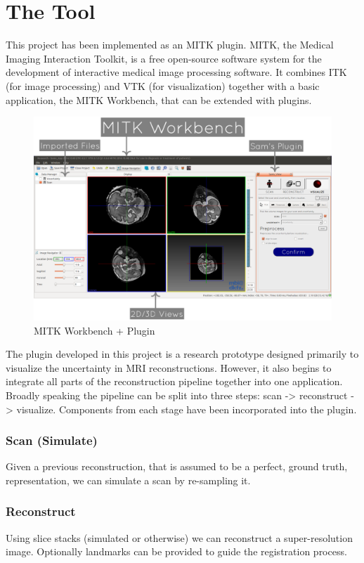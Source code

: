 \chapter{The Tool}
This project has been implemented as an MITK plugin. MITK, the Medical Imaging Interaction Toolkit, is a free open-source software system for the development of interactive medical image processing software. It combines ITK (for image processing) and VTK (for visualization) together with a basic application, the MITK Workbench, that can be extended with plugins.

\begin{figure}[H]
  \includegraphics[width=\textwidth]{images/tool/mitk.png}
  \caption{MITK Workbench + Plugin}\label{fig:mitkoverview}
\end{figure}

The plugin developed in this project is a research prototype designed primarily to visualize the uncertainty in MRI reconstructions. However, it also begins to integrate all parts of the reconstruction pipeline together into one application. Broadly speaking the pipeline can be split into three steps: scan -> reconstruct -> visualize. Components from each stage have been incorporated into the plugin.

\subsection*{Scan (Simulate)}
Given a previous reconstruction, that is assumed to be a perfect, ground truth, representation, we can simulate a scan by re-sampling it.

\subsection*{Reconstruct}
Using slice stacks (simulated or otherwise) we can reconstruct a super-resolution image. Optionally landmarks can be provided to guide the registration process.

